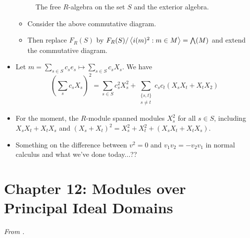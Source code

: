 \documentclass[../notes.tex]{subfiles}
\begin{document}
\begin{itemize}
\begin{figure}[H]
        \caption{The free $R$-algebra on the set $S$ and the exterior algebra.}
        \label{fig:FRSexAlg}
    \end{figure}
    \begin{itemize}
        \item Consider the above commutative diagram.
        \item Then replace $F_R(S)$ by $F_R(S)/\left\langle{i(m)^2:m\in M}\right\rangle=\bigwedge(M)$ and extend the commutative diagram.
    \end{itemize}
    \item Let $m=\sum_{s\in S}c_se_s\mapsto\sum_{s\in S}c_sX_s$. We have
    \begin{equation*}
        \left( \sum_sc_sX_s \right)^2 = \sum_{s\in S}c_s^2X_s^2+\sum_{\substack{\{s,t\}\\s\neq t}}c_sc_t(X_sX_t+X_tX_2)
    \end{equation*}
    \item For the moment, the $R$-module spanned modules $X_s^2$ for all $s\in S$, including $X_sX_t+X_tX_s$ and $(X_s+X_t)^2=X_s^2+X_t^2+(X_sX_t+X_tX_s)$.
    \item Something on the difference between $v^2=0$ and $v_1v_2=-v_2v_1$ in normal calculus and what we've done today...??
\end{itemize}



\section{Chapter 12: Modules over Principal Ideal Domains}
\emph{From \textcite{bib:DummitFoote}.}
\setcounter{bookch}{12}
\setcounter{proposition}{11}
\end{document}
